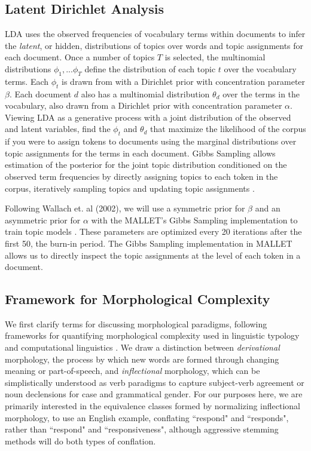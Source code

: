 \documentclass[11pt,a4paper]{article}
\begin{document}
\subsection{Latent Dirichlet Analysis}
LDA uses the observed frequencies of vocabulary terms within documents to infer the \textit{latent}, or hidden, distributions of topics over words and topic assignments for each document. Once a number of topics $T$ is selected, the multinomial distributions $\phi_1,...\phi_T$ define the distribution of each topic $t$ over the vocabulary terms. Each $\phi_t$ is drawn from with a Dirichlet prior with concentration parameter $\beta$. Each document $d$ also has a multinomial distribution $\theta_d$ over the terms in the vocabulary, also drawn from a Dirichlet prior with concentration parameter $\alpha$. Viewing LDA as a generative process with a joint distribution of the observed and latent variables, find the $\phi_t$ and $\theta_d$ that maximize the likelihood of the corpus if you were to assign tokens to documents using the marginal distributions over topic assignments for the terms in each document. Gibbs Sampling allows estimation of the posterior for the joint topic distribution conditioned on the observed term frequencies by directly assigning topics to each token in the corpus, iteratively sampling topics and updating topic assignments
 \cite{steyvers2007probabilistic, blei2003,schofield-mimno-2016-comparing}.

Following Wallach et. al (2002), we will use a symmetric prior for $\beta$ and an asymmetric prior for $\alpha$ with the MALLET's Gibbs Sampling implementation to train topic models \cite{wallach2009rethinking,McCallumMALLET}. These parameters are optimized every 20 iterations after the first 50, the burn-in period. The Gibbs Sampling implementation in MALLET allows us to directly inspect the topic assignments at the level of each token in a document.

\subsection{Framework for Morphological Complexity}
We first clarify terms for discussing morphological paradigms, following frameworks for quantifying morphological complexity used in linguistic typology and computational linguistics \cite{baerman2015understanding, Ackerman2013MorphologicalOT, cotterell-etal-2019-complexity}. We draw a distinction between \textit{derivational} morphology, the process by which new words are formed through changing meaning or part-of-speech, and \textit{inflectional} morphology, which can be simplistically understood as verb paradigms to capture subject-verb agreement or noun declensions for case and grammatical gender. For our purposes here, we are primarily interested in the equivalence classes formed by normalizing inflectional morphology, to use an English example, conflating ``respond" and ``responds", rather than ``respond" and ``responsiveness", although aggressive stemming methods will do both types of conflation.
\end{document}
